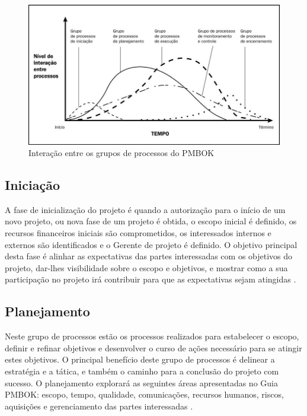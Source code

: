 \documentclass[
    12pt,               %
    openright,          %
    twoside,            %
    a4paper,            %
    chapter=TITLE,     %
    english,            %
    spanish,            %
    portuguese              %
    ]{abntex2}
\begin{document}
\begin{figure}[htb]
\RawFloats
	\caption{\label{fig:grupo_processos}Interação entre os grupos de processos do PMBOK}
	\begin{center}
	    \includegraphics[scale=0.50]{figuras/grupos_processos.jpg}
	\end{center}
\end{figure}

\subsection{Iniciação}
A fase de inicialização do projeto é quando a autorização para o início de um novo projeto, ou nova fase de um projeto é obtida, o escopo inicial é definido, os recursos financeiros iniciais são comprometidos, os interessados internos e externos são identificados e o Gerente de projeto é definido. O objetivo principal desta fase é alinhar as expectativas das partes interessadas com os objetivos do projeto, dar-lhes visibilidade sobre o escopo e objetivos, e mostrar como a sua participação no projeto irá contribuir para que as expectativas sejam atingidas \cite[p.~54]{pmi2013}.

\subsection{Planejamento}
Neste grupo de processos estão os processos realizados para estabelecer o escopo, definir e refinar objetivos e desenvolver o curso de ações necessário para se atingir estes objetivos. O principal benefício deste grupo de processos é delinear a estratégia e a tática, e também o caminho para a conclusão do projeto com sucesso. O planejamento explorará as seguintes áreas apresentadas no Guia PMBOK: escopo, tempo, qualidade, comunicações, recursos humanos, riscos, aquisições e gerenciamento das partes interessadas \cite[p.~55]{pmi2013}.
\end{document}
